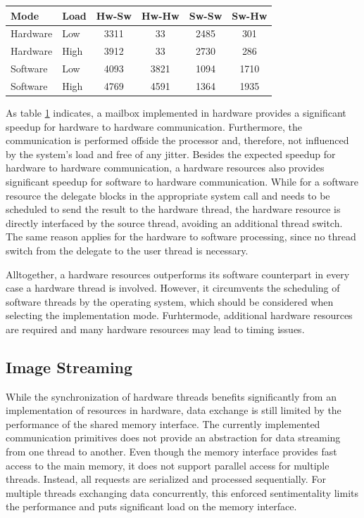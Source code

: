 \begin{table}
	\scriptsize
	\centering
	\label{tab:mbox_turn}
	\begin{tabular}{llcccc}
	\hline
	\textbf{Mode} & \textbf{Load} & \textbf{Hw-Sw} & \textbf{Hw-Hw} & \textbf{Sw-Sw} & \textbf{Sw-Hw}\\
	\hline
	Hardware & Low & 3311 & 33 & 2485 & 301\\
	Hardware & High & 3912 & 33 & 2730 & 286\\
	Software & Low & 4093 & 3821 & 1094 & 1710\\
	Software & High & 4769 & 4591 & 1364 & 1935\\
	\hline
	\end{tabular}
\end{table}
As table \ref{tab:mbox_turn} indicates, a mailbox implemented in hardware
provides a significant speedup for hardware to hardware communication.
Furthermore, the communication is performed offside the processor and,
therefore, not influenced by the system's load and free of any jitter. Besides
the expected speedup for hardware to hardware communication, a hardware
resources also provides significant speedup for software to hardware
communication. While for a software resource the delegate blocks in the
appropriate system call and needs to be scheduled to send the result to the
hardware thread, the hardware resource is directly interfaced by the source
thread, avoiding an additional thread switch. The same reason applies for the
hardware to software processing, since no thread switch from the delegate to
the user thread is necessary.

Alltogether, a hardware resources outperforms its software counterpart in
every case a hardware thread is involved. However, it circumvents the
scheduling of software threads by the operating system, which should be
considered when selecting the implementation mode. Furhtermode, additional
hardware resources are required and many hardware resources may lead to timing
issues.

\subsection{Image Streaming}
While the synchronization of hardware threads benefits significantly from an
implementation of resources in hardware, data exchange is still limited by the
performance of the shared memory interface. The currently implemented
communication primitives does not provide an abstraction for data streaming
from one thread to another. Even though the memory interface provides fast
access to the main memory, it does not support parallel access for multiple
threads. Instead, all requests are serialized and processed sequentially. For
multiple threads exchanging data concurrently, this enforced sentimentality
limits the performance and puts significant load on the memory interface.

